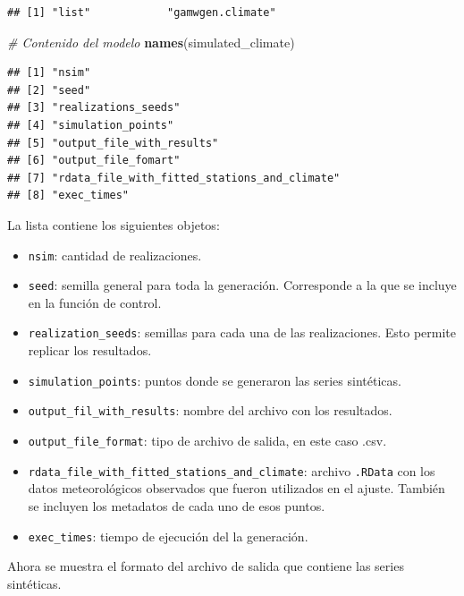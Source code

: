 \documentclass[
  12pt]{article}
\newenvironment{Shaded}{}{}
\newcommand{\CommentTok}[1]{\textcolor[rgb]{0.38,0.63,0.69}{\textit{#1}}}
\newcommand{\KeywordTok}[1]{\textcolor[rgb]{0.00,0.44,0.13}{\textbf{#1}}}
\newcommand{\NormalTok}[1]{#1}
\providecommand{\tightlist}{%
  \setlength{\itemsep}{0pt}\setlength{\parskip}{0pt}}
\begin{document}
\begin{verbatim}
## [1] "list"            "gamwgen.climate"
\end{verbatim}

\begin{Shaded}
\begin{Highlighting}[]
\CommentTok{# Contenido del modelo }
\KeywordTok{names}\NormalTok{(simulated_climate)}
\end{Highlighting}
\end{Shaded}

\begin{verbatim}
## [1] "nsim"                                       
## [2] "seed"                                       
## [3] "realizations_seeds"                         
## [4] "simulation_points"                          
## [5] "output_file_with_results"                   
## [6] "output_file_fomart"                         
## [7] "rdata_file_with_fitted_stations_and_climate"
## [8] "exec_times"
\end{verbatim}

La lista contiene los siguientes objetos:

\begin{itemize}
\tightlist
\item
  \texttt{nsim}: cantidad de realizaciones.
\item
  \texttt{seed}: semilla general para toda la generación. Corresponde a la que se incluye en la función de control.
\item
  \texttt{realization\_seeds}: semillas para cada una de las realizaciones. Esto permite replicar los resultados.
\item
  \texttt{simulation\_points}: puntos donde se generaron las series sintéticas.
\item
  \texttt{output\_fil\_with\_results}: nombre del archivo con los resultados.
\item
  \texttt{output\_file\_format}: tipo de archivo de salida, en este caso .csv.
\item
  \texttt{rdata\_file\_with\_fitted\_stations\_and\_climate}: archivo \texttt{.RData} con los datos meteorológicos observados que fueron utilizados en el ajuste. También se incluyen los metadatos de cada uno de esos puntos.
\item
  \texttt{exec\_times}: tiempo de ejecución del la generación.
\end{itemize}

Ahora se muestra el formato del archivo de salida que contiene las series sintéticas.
\end{document}
